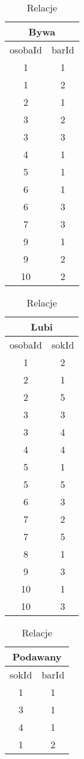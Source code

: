 \begin{table}
    \begin{tabular}[t]{|c|c|}
        \hline
        \multicolumn{2}{|c|}{Bywa} \\
        \hline
        osobaId & barId \\
        \hline
            1 & 1 \\
            1 & 2 \\
            2 & 1 \\
            3 & 2 \\
            3 & 3 \\
            4 & 1 \\
            5 & 1 \\
            6 & 1 \\
            6 & 3 \\
            7 & 3 \\
            9 & 1 \\
            9 & 2 \\
            10 & 2 \\
        \hline
    \end{tabular}
    \hfill
    \begin{tabular}[t]{|c|c|}
        \hline
        \multicolumn{2}{|c|}{Lubi} \\
        \hline
        osobaId & sokId \\
        \hline
        1 & 2 \\
        2 & 1 \\
        2 & 5 \\
        3 & 3 \\
        3 & 4 \\
        4 & 4 \\
        5 & 1 \\
        5 & 5 \\
        6 & 3 \\
        7 & 2 \\
        7 & 5 \\
        8 & 1 \\
        9 & 3 \\
        10 & 1 \\
        10 & 3 \\
        \hline
    \end{tabular}
    \hfill
    \begin{tabular}[t]{|c|c|}
        \hline
        \multicolumn{2}{|c|}{Podawany} \\
        \hline
        sokId & barId \\
        \hline
        1 & 1 \\
        3 & 1 \\
        4 & 1 \\
        1 & 2 \\
        \hline
    \end{tabular}
    \caption{Relacje}
\end{table}
\clearpage

